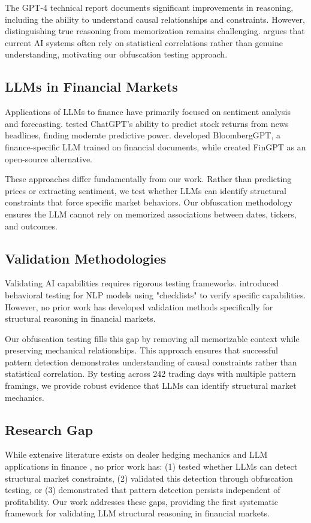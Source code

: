 The GPT-4 technical report \cite{openai2023gpt4} documents significant improvements in reasoning, including the ability to understand causal relationships and constraints. However, distinguishing true reasoning from memorization remains challenging. \cite{marcus2019rebooting} argues that current AI systems often rely on statistical correlations rather than genuine understanding, motivating our obfuscation testing approach.

\subsection{LLMs in Financial Markets}

Applications of LLMs to finance have primarily focused on sentiment analysis and forecasting. \cite{lopez2023can} tested ChatGPT's ability to predict stock returns from news headlines, finding moderate predictive power. \cite{wu2023bloomberggpt} developed BloombergGPT, a finance-specific LLM trained on financial documents, while \cite{chen2023fingpt} created FinGPT as an open-source alternative.

These approaches differ fundamentally from our work. Rather than predicting prices or extracting sentiment, we test whether LLMs can identify structural constraints that force specific market behaviors. Our obfuscation methodology ensures the LLM cannot rely on memorized associations between dates, tickers, and outcomes.

\subsection{Validation Methodologies}

Validating AI capabilities requires rigorous testing frameworks. \cite{ribeiro2020beyond} introduced behavioral testing for NLP models using "checklists" to verify specific capabilities. However, no prior work has developed validation methods specifically for structural reasoning in financial markets.

Our obfuscation testing fills this gap by removing all memorizable context while preserving mechanical relationships. This approach ensures that successful pattern detection demonstrates understanding of causal constraints rather than statistical correlation. By testing across 242 trading days with multiple pattern framings, we provide robust evidence that LLMs can identify structural market mechanics.

\subsection{Research Gap}

While extensive literature exists on dealer hedging mechanics \cite{ni2005stock,garleanu2009demand} and LLM applications in finance \cite{lopez2023can,chen2023fingpt}, no prior work has:
(1) tested whether LLMs can detect structural market constraints,
(2) validated this detection through obfuscation testing, or
(3) demonstrated that pattern detection persists independent of profitability.
Our work addresses these gaps, providing the first systematic framework for validating LLM structural reasoning in financial markets.